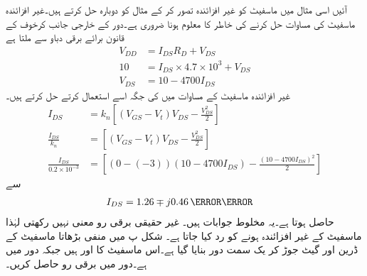 آئیں اسی مثال میں ماسفیٹ کو غیر افزائندہ تصور کر کے مثال کو دوبارہ حل کرتے ہیں۔غیر افزائندہ ماسفیٹ کی مساوات حل کرنے کی خاطر   کا معلوم ہونا ضروری ہے۔دور کے خارجی جانب کرخوف کے قانون برائے برقی دباو سے ملتا ہے
\begin{align*}
V_{DD}&=I_{DS} R_D+V_{DS}\\
10&=I_{DS} \times 4.7 \times 10^{3}+V_{DS}\\
V_{DS}&=10-4700 I_{DS}
\end{align*}
غیر افزائندہ ماسفیٹ کے مساوات میں  کی جگہ اسے استعمال کرتے حل کرتے ہیں۔
\begin{align*}
I_{DS}&=k_n \left[\left(V_{GS}-V_t \right )V_{DS} -\frac{V_{DS}^{2}}{2}\right ]\\
\frac{I_{DS}}{k_n}&=\left[\left(V_{GS}-V_t \right )V_{DS} -\frac{V_{DS}^{2}}{2}\right ]\\
\frac{I_{DS}}{0.2 \times 10^{-3}}&=\left[\left(0-(-3) \right ) \left(10-4700 I_{DS} \right )- \frac{\left( 10-4700 I_{DS} \right )^{2}}{2}\right]
\end{align*}
سے
\begin{align*}
I_{DS}&=1.26\mp j 0.46 \,{\milli \ampere}
\end{align*}
حاصل ہوتا ہے۔یہ مخلوط جوابات ہیں۔ غیر حقیقی برقی رو معنی نہیں رکھتی لہٰذا ماسفیٹ کے غیر افزائندہ ہونے کو رد کیا جاتا ہے۔
 
شکل  پ میں منفی بڑھاتا ماسفیٹ کے ڈرین اور گیٹ جوڑ کر یک سمت دور بنایا گیا ہے۔اس ماسفیٹ کا  اور  ہیں  جبکہ دور میں   ہے۔دور میں برقی رو حاصل کریں۔

